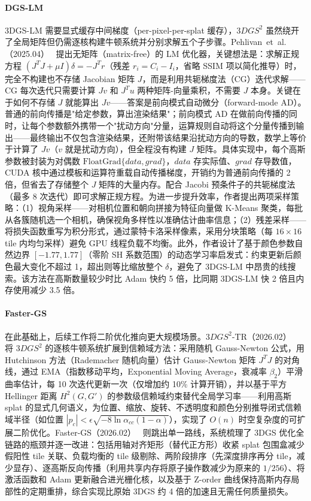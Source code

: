 \paragraph{DGS-LM}
3DGS-LM 需要显式缓存中间梯度（per-pixel-per-splat 缓存），$3DGS^2$ 虽然绕开了全局矩阵但仍需逐核构建牛顿系统并分别求解五个子步骤。Pehlivan~et~al.（2025.04）~\cite{2504_12905} 提出无矩阵（matrix-free）的 LM 优化器，关键想法是：求解正规方程 $(J^TJ + \mu I)\delta = -J^Tr$（残差 $r_i = C_i - I_i$，省略 SSIM 项以简化推导）时，完全不构建也不存储 Jacobian 矩阵 $J$，而是利用共轭梯度法（CG）迭代求解——CG 每次迭代只需要计算 $Jv$ 和 $J^Tu$ 两种矩阵-向量乘积，不需要 $J$ 本身。关键在于如何不存储 $J$ 就能算出 $Jv$——答案是前向模式自动微分（forward-mode AD）。普通的前向传播是"给定参数，算出渲染结果"；前向模式 AD 在做前向传播的同时，让每个参数额外携带一个"扰动方向"分量，运算规则自动将这个分量传播到输出——最终输出不仅包含渲染结果，还附带该结果沿扰动方向的导数，数学上等价于计算了 $Jv$（$v$ 就是扰动方向），但全程没有构建 $J$ 矩阵。具体实现中，每个高斯参数被封装为对偶数 $\text{FloatGrad}\{data, grad\}$，$data$ 存实际值、$grad$ 存导数值，CUDA 核中通过模板和运算符重载自动传播梯度，开销约为普通前向传播的 2 倍，但省去了存储整个 $J$ 矩阵的大量内存。配合 Jacobi 预条件子的共轭梯度法（最多 8 次迭代）即可求解正规方程。为进一步提升效率，作者提出两项采样策略：（1）视角采样——对相机位置和朝向拼接为特征向量做 K-Means 聚类，每批从各簇随机选一个相机，确保视角多样性以准确估计曲率信息；（2）残差采样——将损失函数重写为积分形式，通过蒙特卡洛采样像素，采用分块策略（每 $16 \times 16$ tile 内均匀采样）避免 GPU 线程负载不均衡。此外，作者设计了基于颜色参数自然边界 $[-1.77, 1.77]$（零阶 SH 系数范围）的动态学习率启发式：约束更新后颜色最大变化不超过 1，超出则等比缩放整个 $\delta$，避免了 3DGS-LM 中昂贵的线搜索。该方法在高斯数量较少时比 Adam 快约 5 倍，比同期 3DGS-LM 快 2 倍且内存使用减少 3.5 倍。

\paragraph{Faster-GS}
在此基础上，后续工作将二阶优化推向更大规模场景。$3DGS^2$-TR（2026.02）~\cite{2602_00395} 将 $3DGS^2$ 的逐核牛顿系统扩展到信赖域方法：采用随机 Gauss-Newton 公式，用 Hutchinson 方法（Rademacher 随机向量）估计 Gauss-Newton 矩阵 $J^TJ$ 的对角线，通过 EMA（指数移动平均，Exponential Moving Average，衰减率 $\beta_2$）平滑曲率估计，每 10 次迭代更新一次（仅增加约 10\% 计算开销），并以基于平方 Hellinger 距离 $H^2(G, G')$ 的参数级信赖域约束替代全局学习率——利用高斯 splat 的显式几何语义，为位置、缩放、旋转、不透明度和颜色分别推导闭式信赖域半径（如位置 $|p_c| < \epsilon\sqrt{-8\ln\alpha_{cc}(1-\alpha)}$），实现了 $O(n)$ 时空复杂度的可扩展二阶优化。Faster-GS（2026.02）~\cite{2602_09999} 则跳出单一路线，系统梳理了 3DGS 优化全链路的瓶颈并逐一改进：包括用轴对齐矩形（替代正方形）收紧 splat 包围盒减少假阳性 tile 关联、负载均衡的 tile 级剔除、两阶段排序（先深度排序再分 tile，减少显存）、逐高斯反向传播（利用共享内存将原子操作数减少为原来的 $1/256$）、将激活函数和 Adam 更新融合进光栅化核，以及基于 Z-order 曲线保持高斯内存局部性的定期重排，综合实现比原始 3DGS 约 4 倍的加速且无需任何质量损失。

